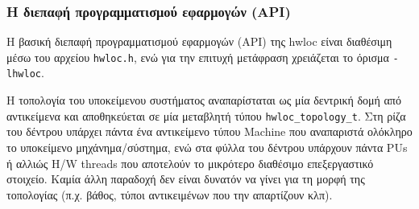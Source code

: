 %
%
%


\subsubsection{Η διεπαφή προγραμματισμού εφαρμογών (API)}
Η βασική διεπαφή προγραμματισμού εφαρμογών (API) της hwloc είναι διαθέσιμη μέσω του αρχείου \texttt{hwloc.h}, ενώ για την επιτυχή μετάφραση χρειάζεται το όρισμα \texttt{-lhwloc}.

Η τοπολογία του υποκείμενου συστήματος αναπαρίσταται ως μία δεντρική δομή από αντικείμενα και αποθηκεύεται σε μία μεταβλητή τύπου \texttt{hwloc\_topology\_t}. Στη ρίζα του δέντρου υπάρχει πάντα ένα αντικείμενο τύπου Machine που αναπαριστά ολόκληρο το υποκείμενο μηχάνημα/σύστημα, ενώ στα φύλλα του δέντρου υπάρχουν πάντα PUs ή αλλιώς H/W threads που αποτελούν το μικρότερο διαθέσιμο επεξεργαστικό στοιχείο. Καμία άλλη παραδοχή δεν είναι δυνατόν να γίνει για τη μορφή της τοπολογίας (π.χ. βάθος, τύποι αντικειμένων που την απαρτίζουν κλπ).

